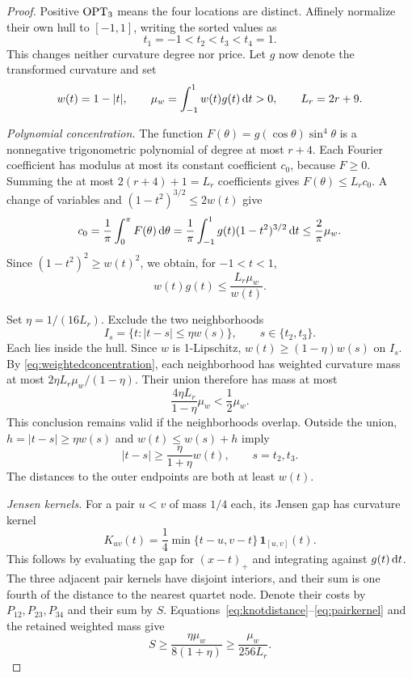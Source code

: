 \begin{proof}
Positive $\operatorname{OPT}_3$ means the four locations are distinct. Affinely normalize their own hull to $[-1,1]$, writing the sorted values as
\[
t_1=-1<t_2<t_3<t_4=1.
\]
This changes neither curvature degree nor price. Let $g$ now denote the transformed curvature and set
\[
w(t)=1-|t|,\qquad \mu_w=\int_{-1}^1w(t)g(t)\,\mathrm d t>0,\qquad L_r=2r+9.
\]

\emph{Polynomial concentration.}
The function $F(\theta)=g(\cos\theta)\sin^4\theta$ is a nonnegative trigonometric polynomial of degree at most $r+4$. Each Fourier coefficient has modulus at most its constant coefficient $c_0$, because $F\ge0$. Summing the at most $2(r+4)+1=L_r$ coefficients gives $F(\theta)\le L_rc_0$. A change of variables and $(1-t^2)^{3/2}\le2w(t)$ give
\[
c_0=\frac1\pi\int_0^\pi F(\theta)\,\mathrm d\theta
=\frac1\pi\int_{-1}^1g(t)(1-t^2)^{3/2}\,\mathrm d t
\le\frac2\pi\mu_w.
\]
Since $(1-t^2)^2\ge w(t)^2$, we obtain, for $-1<t<1$,
\begin{equation}
w(t)g(t)\le\frac{L_r\mu_w}{w(t)}.
\label{eq:weightedconcentration}
\end{equation}

Set $\eta=1/(16L_r)$. Exclude the two neighborhoods
\[
I_s=\{t:|t-s|\le\eta w(s)\},\qquad s\in\{t_2,t_3\}.
\]
Each lies inside the hull. Since $w$ is 1-Lipschitz, $w(t)\ge(1-\eta)w(s)$ on $I_s$. By \eqref{eq:weightedconcentration}, each neighborhood has weighted curvature mass at most $2\eta L_r\mu_w/(1-\eta)$. Their union therefore has mass at most
\[
\frac{4\eta L_r}{1-\eta}\mu_w<\frac12\mu_w.
\]
This conclusion remains valid if the neighborhoods overlap. Outside the union, $h=|t-s|\ge\eta w(s)$ and $w(t)\le w(s)+h$ imply
\begin{equation}
|t-s|\ge\frac{\eta}{1+\eta}w(t),\qquad s=t_2,t_3.
\label{eq:knotdistance}
\end{equation}
The distances to the outer endpoints are both at least $w(t)$.

\emph{Jensen kernels.}
For a pair $u<v$ of mass $1/4$ each, its Jensen gap has curvature kernel
\begin{equation}
K_{uv}(t)=\frac14\min\{t-u,v-t\}\,\mathbf1_{[u,v]}(t).
\label{eq:pairkernel}
\end{equation}
This follows by evaluating the gap for $(x-t)_+$ and integrating against $g(t)\,\mathrm d t$. The three adjacent pair kernels have disjoint interiors, and their sum is one fourth of the distance to the nearest quartet node. Denote their costs by $P_{12},P_{23},P_{34}$ and their sum by $S$. Equations~\eqref{eq:knotdistance}--\eqref{eq:pairkernel} and the retained weighted mass give
\begin{equation}
S\ge\frac{\eta\mu_w}{8(1+\eta)}\ge\frac{\mu_w}{256L_r}.
\label{eq:adjacentlower}
\end{equation}


\end{proof}
